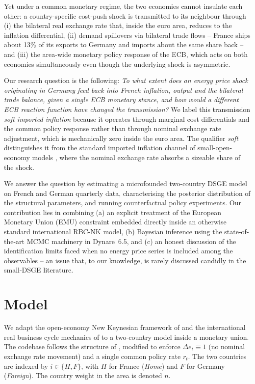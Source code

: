 \documentclass[11pt,a4paper]{article}
\begin{document}
Yet under a common monetary regime, the two economies cannot
insulate each other: a country-specific cost-push shock is
transmitted to its neighbour through (i) the bilateral
real exchange rate that, inside the euro area, reduces to the
inflation differential, (ii) demand spillovers via bilateral trade
flows -- France ships about 13\% of its exports to Germany and
imports about the same share back -- and (iii) the area-wide
monetary policy response of the ECB, which acts on both economies
simultaneously even though the underlying shock is asymmetric.

Our research question is the following: \emph{To what extent does an
energy price shock originating in Germany feed back into French
inflation, output and the bilateral trade balance, given a single
ECB monetary stance, and how would a different ECB reaction function
have changed the transmission?} We label this transmission
\emph{soft imported inflation} because it operates through marginal
cost differentials and the common policy response rather than
through nominal exchange rate adjustment, which is mechanically zero
inside the euro area. The qualifier \emph{soft} distinguishes it
from the standard imported inflation channel of small-open-economy
models \citep{GaliMonacelli2005}, where the nominal exchange rate
absorbs a sizeable share of the shock.

We answer the question by estimating a microfounded two-country DSGE
model on French and German quarterly data, characterising the
posterior distribution of the structural parameters, and running
counterfactual policy experiments. Our contribution lies in
combining (a) an explicit treatment of the European Monetary Union
(EMU) constraint embedded directly inside an otherwise standard
international RBC-NK model, (b) Bayesian inference using the
state-of-the-art MCMC machinery in Dynare~6.5, and (c) an honest
discussion of the identification limits faced when no energy price
series is included among the observables -- an issue that, to our
knowledge, is rarely discussed candidly in the small-DSGE literature.

\section{Model}
We adapt the open-economy New Keynesian framework of
\citet{Kollmann2001} and the international real business cycle
mechanics of \citet{BackusKehoeKydland1992} to a two-country model
inside a monetary union. The codebase follows the structure of
\citet{Vermandel2025}, modified to enforce
$\Delta e_t \equiv 1$ (no nominal exchange rate movement) and a single
common policy rate $r_t$. The two countries are indexed by
$i \in \{H,F\}$, with $H$ for France (\emph{Home}) and $F$ for
Germany (\emph{Foreign}). The country weight in the area is denoted
$n$.
\end{document}
